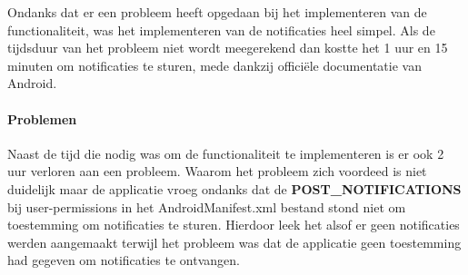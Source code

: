 Ondanks dat er een probleem heeft opgedaan bij het implementeren van de functionaliteit, was 
het implementeren van de notificaties heel simpel. Als de tijdsduur van het probleem niet wordt meegerekend 
dan kostte het 1 uur en 15 minuten om notificaties te sturen, mede dankzij officiële documentatie van Android.

\paragraph{Problemen}
Naast de tijd die nodig was om de functionaliteit te implementeren is er ook 2 uur verloren aan een probleem. 
Waarom het probleem zich voordeed is niet duidelijk maar de applicatie vroeg ondanks dat de 
\textbf{POST\_NOTIFICATIONS} bij user-permissions in het AndroidManifest.xml bestand stond 
niet om toestemming om notificaties te sturen. Hierdoor leek het alsof er geen notificaties werden aangemaakt
terwijl het probleem was dat de applicatie geen toestemming had gegeven om notificaties te ontvangen.